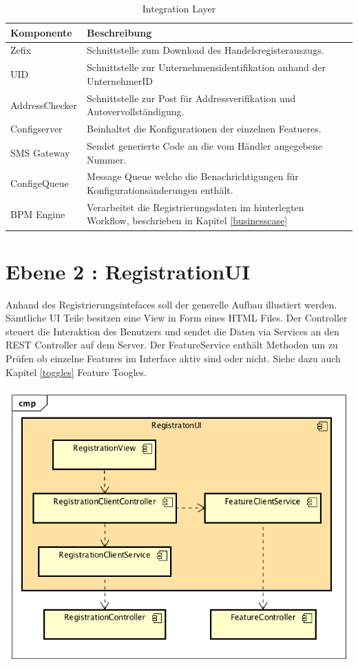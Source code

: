 \begin{table}[H]
	\centering
	\caption{Integration Layer}
	\begin{tabular}{ | p{4cm} | p{11cm} | }
		\toprule
		{\textbf{Komponente}} & {\textbf{Beschreibung}} \\
		\midrule
		Zefix &  Schnittstelle zum Download des Handelsregisterauszugs. \\ \hline
		UID &  Schnittstelle zur Unternehmensidentifikation anhand der UnternehmerID \\ \hline
		AddressChecker &  Schnittstelle zur Post für Addressverifikation und Autovervollständigung. \\ \hline
		Configserver &  Beinhaltet die Konfigurationen der einzelnen Featueres. \\ \hline
		SMS Gateway &  Sendet generierte Code an die vom Händler angegebene Nummer. \\ \hline
		ConfigeQueue & Message Queue welche die Benachrichtigungen für Konfigurationsänderungen enthält. \\ \hline
		BPM Engine & Verarbeitet die Registrierungsdaten im hinterlegten Workflow, beschrieben in Kapitel \ref{businesscase}\\
		\bottomrule
	\end{tabular}
\end{table}
\newpage


\section{Ebene 2 : RegistrationUI}
Anhand des Registrierungsintefaces soll der generelle Aufbau illustiert werden. Sämtliche UI Teile besitzen eine View in Form eines HTML Files. Der Controller steuert die Interaktion des Benutzers und sendet die Daten via Services an den REST Controller auf dem Server. Der FeatureService enthält Methoden um zu Prüfen ob einzelne Features im Interface aktiv sind oder nicht. Siehe dazu auch Kapitel \ref{toggles} Feature Toogles.

\begin{center}
	\includegraphics[scale=0.8]{WebComponentLevel2.png}
\end{center}
\newpage
